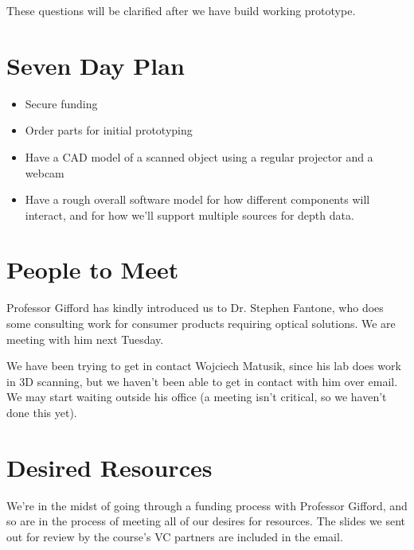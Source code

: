 \documentclass[10pt]{article}
\begin{document}
These questions will be clarified after we have build working prototype.

\section{Seven Day Plan}
\begin{itemize}
\item Secure funding
\item Order parts for initial prototyping
\item Have a CAD model of a scanned object using a regular projector and a
  webcam
\item Have a rough overall software model for how different components will
  interact, and for how we'll support multiple sources for depth data.
\end{itemize}

\section{People to Meet}
Professor Gifford has kindly introduced us to Dr. Stephen Fantone, who does some
consulting work for consumer products requiring optical solutions.  We are
meeting with him next Tuesday.

We have been trying to get in contact Wojciech Matusik, since his lab does work
in 3D scanning, but we haven't been able to get in contact with him over email.
We may start waiting outside his office (a meeting isn't critical, so we haven't
done this yet).

\section{Desired Resources}
We're in the midst of going through a funding process with Professor Gifford,
and so are in the process of meeting all of our desires for resources. The
slides we sent out for review by the course's VC partners are included in the email.

\begin{appendix}

\end{appendix}
\end{document}
